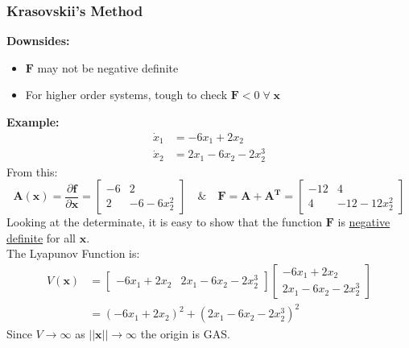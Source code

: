 \documentclass[11pt,handout]{beamer}   %
\begin{document}
\begin{frame}
\frametitle{Krasovskii's Method}
\small
\textbf{Downsides:}
\begin{itemize}
\item $\mathbf{F}$ may not be negative definite
\item For higher order systems, tough to check $\mathbf{F} < 0 \; \forall \; \mathbf{x}$
\end{itemize}
\textbf{Example:}
\begin{equation*}
\begin{aligned}
\dot{x}_1 &= -6 x_1 + 2x_2\\
\dot{x}_2 &= 2 x_1  - 6x_2 - 2x_2^3
\end{aligned}
\end{equation*}
From this:
\begin{equation*}
\mathbf{A(x)} = \frac{\partial \mathbf{f}}{\partial \mathbf{x}} = \begin{bmatrix}
-6 & 2\\2 & -6 - 6x_2^2
\end{bmatrix} \quad \& \quad \mathbf{F = A+ A^T} = \begin{bmatrix}
-12 & 4\\4 & -12 -12 x_2^2
\end{bmatrix}
\end{equation*}
Looking at the determinate, it is easy to show that the function $\mathbf{F}$ is \underline{negative definite} for all $\mathbf{x}$. \\
\vspace{6pt}
The Lyapunov Function is: 
\begin{equation*}
\begin{aligned}
V(\mathbf{x}) &= 
\begin{bmatrix}
-6 x_1 + 2x_2 &
2 x_1 - 6x_2 - 2x_2^3
\end{bmatrix}
\begin{bmatrix}
-6 x_1 + 2x_2 \\
2 x_1 - 6x_2 - 2x_2^3
\end{bmatrix}\\
 &= (-6 x_1 + 2x_2)^2 + (2 x_1 - 6 x_2 - 2x_2^3)^2
\end{aligned}
\end{equation*}
Since $V \rightarrow \infty$ as $||\mathbf{x}|| \rightarrow \infty$ the origin is GAS.
\end{frame}
\end{document}
